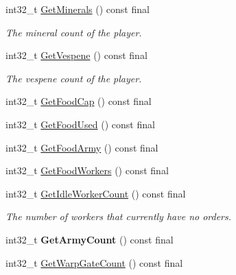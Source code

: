 \begin{DoxyCompactItemize}
int32\+\_\+t \hyperlink{classsc2_1_1_observation_imp_a2b21ca608004c8373a3fbf41cbd6aff8}{Get\+Minerals} () const final
\begin{DoxyCompactList}\small\item\em The mineral count of the player. \end{DoxyCompactList}\item 
\mbox{\label{classsc2_1_1_observation_imp_a04ff3da52e40caef820ea50c9eaefa35}} 
int32\+\_\+t \hyperlink{classsc2_1_1_observation_imp_a04ff3da52e40caef820ea50c9eaefa35}{Get\+Vespene} () const final
\begin{DoxyCompactList}\small\item\em The vespene count of the player. \end{DoxyCompactList}\item 
int32\+\_\+t \hyperlink{classsc2_1_1_observation_imp_a5e109c30ac039c19bf0c7d3b35bd7ab7}{Get\+Food\+Cap} () const final
\item 
int32\+\_\+t \hyperlink{classsc2_1_1_observation_imp_a5489d7a3c6095b29c82e835bb3eb2aba}{Get\+Food\+Used} () const final
\item 
int32\+\_\+t \hyperlink{classsc2_1_1_observation_imp_a97f6013fc1578cc1db1266d39edab7c4}{Get\+Food\+Army} () const final
\item 
int32\+\_\+t \hyperlink{classsc2_1_1_observation_imp_a88f76eedeac5d81f608b68ca3ff69782}{Get\+Food\+Workers} () const final
\item 
\mbox{\label{classsc2_1_1_observation_imp_a25d0052c15ff3f0fcc2e6c63801f659f}} 
int32\+\_\+t \hyperlink{classsc2_1_1_observation_imp_a25d0052c15ff3f0fcc2e6c63801f659f}{Get\+Idle\+Worker\+Count} () const final
\begin{DoxyCompactList}\small\item\em The number of workers that currently have no orders. \end{DoxyCompactList}\item 
\mbox{\label{classsc2_1_1_observation_imp_a694cbb593716e78de0f651790194a6b2}} 
int32\+\_\+t {\bfseries Get\+Army\+Count} () const final
\item 
\mbox{\label{classsc2_1_1_observation_imp_a0ca93e4c0bef3538f5c95faf92f166e0}} 
int32\+\_\+t \hyperlink{classsc2_1_1_observation_imp_a0ca93e4c0bef3538f5c95faf92f166e0}{Get\+Warp\+Gate\+Count} () const final

\end{DoxyCompactItemize}
